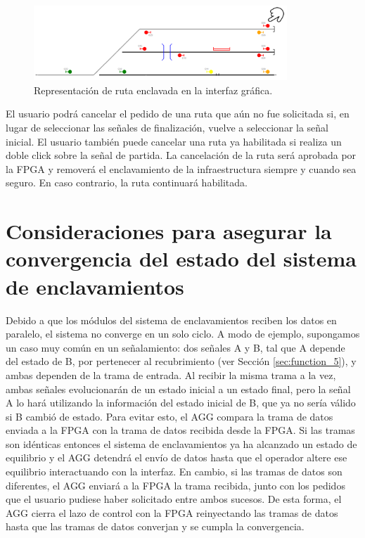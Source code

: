 	\begin{figure}[H]
		\centering
		\includegraphics[width=0.85\textwidth]{AGG/images/AGG_routes_3}
		\centering\caption{Representación de ruta enclavada en la interfaz gráfica.}
		\label{fig:AGG_routes_3}
	\end{figure}
	
	El usuario podrá cancelar el pedido de una ruta que aún no fue solicitada si, en lugar de seleccionar las señales de finalización, vuelve a seleccionar la señal inicial. El usuario también puede cancelar una ruta ya habilitada si realiza un doble click sobre la señal de partida. La cancelación de la ruta será aprobada por la FPGA y removerá el enclavamiento de la infraestructura siempre y cuando sea seguro. En caso contrario, la ruta continuará habilitada.
	
	
		
	\section{Consideraciones para asegurar la convergencia del estado del sistema de enclavamientos}
	\label{sec:convergencia}
	
	Debido a que los módulos del sistema de enclavamientos reciben los datos en paralelo, el sistema no converge en un solo ciclo. A modo de ejemplo, supongamos un caso muy común en un señalamiento: dos señales A y B, tal que A depende del estado de B, por pertenecer al recubrimiento (ver Sección \ref{sec:function_5}), y ambas dependen de la trama de entrada. Al recibir la misma trama a la vez, ambas señales evolucionarán de un estado inicial a un estado final, pero la señal A lo hará utilizando la información del estado inicial de B, que ya no sería válido si B cambió de estado. Para evitar esto, el AGG compara la trama de datos enviada a la FPGA con la trama de datos recibida desde la FPGA. Si las tramas son idénticas entonces el sistema de enclavamientos ya ha alcanzado un estado de equilibrio y el AGG detendrá el envío de datos hasta que el operador altere ese equilibrio interactuando con la interfaz. En cambio, si las tramas de datos son diferentes, el AGG enviará a la FPGA la trama recibida, junto con los pedidos que el usuario pudiese haber solicitado entre ambos sucesos. De esta forma, el AGG cierra el lazo de control con la FPGA reinyectando las tramas de datos hasta que las tramas de datos converjan y se cumpla la convergencia.
	
